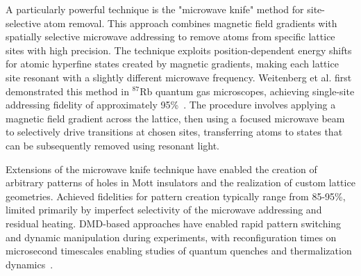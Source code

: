 A particularly powerful technique is the "microwave knife" method for site-selective atom removal. This approach combines magnetic field gradients with spatially selective microwave addressing to remove atoms from specific lattice sites with high precision. The technique exploits position-dependent energy shifts for atomic hyperfine states created by magnetic gradients, making each lattice site resonant with a slightly different microwave frequency. Weitenberg et al. first demonstrated this method in $^{87}$Rb quantum gas microscopes, achieving single-site addressing fidelity of approximately 95\%~\cite{weitenberg_single-spin_2011}. The procedure involves applying a magnetic field gradient across the lattice, then using a focused microwave beam to selectively drive transitions at chosen sites, transferring atoms to states that can be subsequently removed using resonant light.

Extensions of the microwave knife technique have enabled the creation of arbitrary patterns of holes in Mott insulators and the realization of custom lattice geometries. Achieved fidelities for pattern creation typically range from 85-95\%, limited primarily by imperfect selectivity of the microwave addressing and residual heating. DMD-based approaches have enabled rapid pattern switching and dynamic manipulation during experiments, with reconfiguration times on microsecond timescales enabling studies of quantum quenches and thermalization dynamics~\cite{choi_exploring_2016}.




